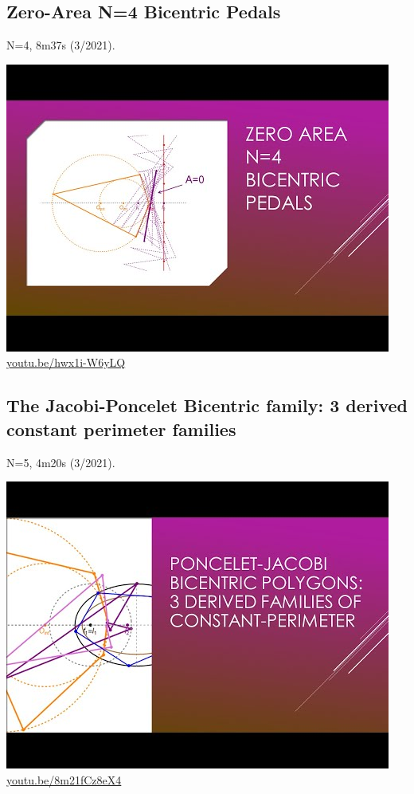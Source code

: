 \documentclass[12pt]{amsart}
\begin{document}
\subsection{Zero-Area N=4 Bicentric Pedals}
\label{vid:hwx1i-W6yLQ}
\noindent N=4, 8m37s (3/2021). 
\begin{center}\includegraphics[width=.5\textwidth]{pics/hwx1i-W6yLQ.jpg} \\ 
\href{https://youtu.be/hwx1i-W6yLQ}{\url{youtu.be/hwx1i-W6yLQ}}\end{center}
% 

\subsection{The Jacobi-Poncelet Bicentric family: 3 derived constant perimeter families}
\label{vid:8m21fCz8eX4}
\noindent N=5, 4m20s (3/2021). 
\begin{center}\includegraphics[width=.5\textwidth]{pics/8m21fCz8eX4.jpg} \\ 
\href{https://youtu.be/8m21fCz8eX4}{\url{youtu.be/8m21fCz8eX4}}\end{center}
% 
\end{document}
